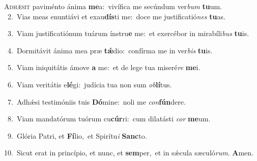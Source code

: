 \lettrine{\initial\textcolor{\initialcolor}{A}}{dhǽsit} paviménto ánima \textbf{me}\-a:~\star vivífica me secúndum ver\textit{bum} \textbf{tu}\-um.\\
{\numbfont\textcolor{\numbcolor}{~2.}}~Vias meas enuntiávi et exau\-\textbf{dís}\-ti me:~\star doce me justificatió\textit{nes} \textbf{tu}\-as.\par
{\numbfont\textcolor{\numbcolor}{~3.}}~Viam justificatiónum tuárum ínstru\textbf{e} me:~\star et exercébor in mirabíli\textit{bus} \textbf{tu}\-is.\par
{\numbfont\textcolor{\numbcolor}{~4.}}~Dormitávit ánima mea præ \textbf{tǽ}\-dio:~\star confírma me in ver\textit{bis} \textbf{tu}\-is.\par
{\numbfont\textcolor{\numbcolor}{~5.}}~Viam iniquitátis ámove \textbf{a} me:~\star et de lege tua miseré\textit{re} \textbf{me}\-i.\par
{\numbfont\textcolor{\numbcolor}{~6.}}~Viam veritátis e\-\textbf{lé}\-gi:~\star judícia tua non sum \textit{ob}\-\textbf{lí}tus.\par
{\numbfont\textcolor{\numbcolor}{~7.}}~Adhǽsi testimóniis tuis \textbf{Dó}\-mine:~\star noli me \textit{con}\-\textbf{fún}dere.\par
{\numbfont\textcolor{\numbcolor}{~8.}}~Viam mandatórum tuórum cu\-\textbf{cúr}\-ri:~\star cum dilatásti \textit{cor} \textbf{me}\-um.\par
{\numbfont\textcolor{\numbcolor}{~9.}}~Glória Patri, et \textbf{Fí}\-lio,~\star et Spirítu\textit{i} \textbf{Sanc}\-to.\par
{\numbfont\textcolor{\numbcolor}{10.}}~Sicut erat in princípio, et nunc, et \textbf{sem}\-per,~\star et in sǽcula sæculó\-\textit{rum}\-. \textbf{A}\-men.\par

